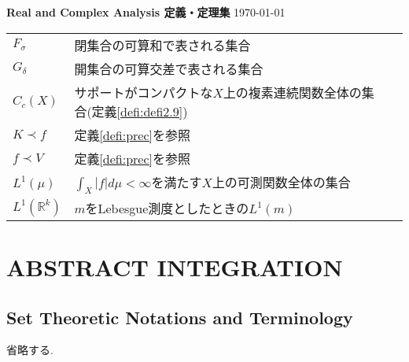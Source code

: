 \documentclass[a4paper]{jsarticle}
\begin{document}
\begin{tcolorbox}
  {\Large \bf Real and Complex Analysis 定義・定理集} \hfill  \today
\end{tcolorbox}

\begin{tabular}[hbtp]{lll}
    $F_\sigma$ & 閉集合の可算和で表される集合 \\
    $G_\delta$ & 開集合の可算交差で表される集合 \\
    $C_c(X)$ & サポートがコンパクトな$X$上の複素連続関数全体の集合(定義\ref{defi:defi2.9}) \\
    $K\prec f$ & 定義\ref{defi:prec}を参照 \\
    $f\prec V$ & 定義\ref{defi:prec}を参照 \\
    $L^1(\mu)$ & $\int_X|f|d\mu < \infty$を満たす$X$上の可測関数全体の集合 \\
    $L^1(\mathbb{R}^k)$ & $m$をLebesgue測度としたときの$L^1(m)$ \\
\end{tabular}

\tableofcontents

\section{ABSTRACT INTEGRATION}
\subsection{Set Theoretic Notations and Terminology}
省略する.
\end{document}
